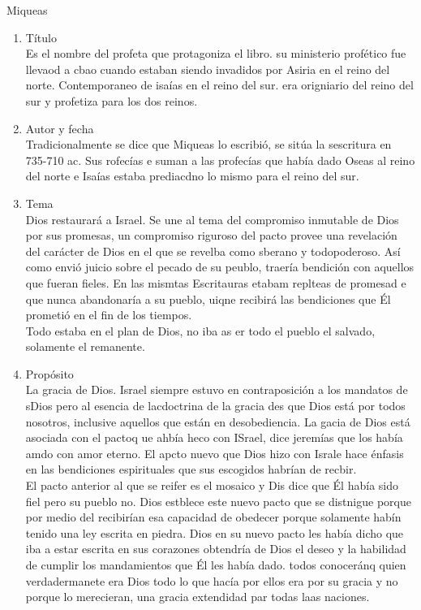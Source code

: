 \documentclass[12pt]{article}
\begin{document}
\begin{section}{Miqueas}
	\begin{enumerate}
		\item Título\\
			Es el nombre del profeta que protagoniza el libro. su ministerio profético fue llevaod a cbao cuando estaban siendo invadidos por Asiria en el reino del norte. Contemporaneo de isaías en el reino del sur. era origniario del reino del sur y profetiza para los dos reinos. 
		\item Autor y fecha\\
			Tradicionalmente se dice que Miqueas lo escribió, se sitúa la sescritura en 735-710 ac. Sus rofecías e suman a las profecías que había dado Oseas al reino del norte e Isaías estaba prediacdno lo mismo para el reino del sur.
		\item Tema\\
			Dios restaurará a Israel. Se une al tema del compromiso inmutable de Dios por sus promesas, un compromiso riguroso del pacto provee una revelación del carácter de Dios en el que se revelba como sberano y todopoderoso. Así como envió juicio sobre el pecado de su peublo, traería bendición con aquellos que fueran fieles. En las mismtas Escritauras etabam replteas de promesad e que nunca abandonaría a su pueblo, uiqne recibirá las bendiciones que Él prometió en el fin de los tiempos.\\
			Todo estaba en el plan de Dios, no iba  as er todo el pueblo el salvado, solamente el remanente.
		\item Propósito\\
			La gracia de Dios. Israel siempre estuvo en contraposición a los mandatos de sDios pero al esencia de lacdoctrina de la gracia des que Dios está por todos nosotros, inclusive aquellos que están en desobediencia. La gacia de Dios está asociada con el pactoq ue ahbía heco con ISrael, dice jeremías que los había amdo con amor eterno. El apcto nuevo que Dios hizo con Israle hace énfasis en las bendiciones espirituales que sus escogidos habrían de recbir.\\
			El pacto anterior al que se reifer es el mosaico y Dis dice que Él había sido fiel pero su pueblo no. Dios estblece este nuevo pacto que se distnigue porque por medio del recibirían esa capacidad de obedecer porque solamente habín tenido una ley escrita en piedra. Dios en su nuevo pacto les había dicho que iba a estar escrita en sus corazones obtendría de Dios el deseo y la habilidad de cumplir los mandamientos que Él les había dado. todos conoceránq quien verdadermanete era Dios  todo lo que hacía por ellos era por su gracia y no porque lo merecieran, una gracia extendidad par todas laas naciones.

\end{enumerate}
\end{section}
\end{document}
